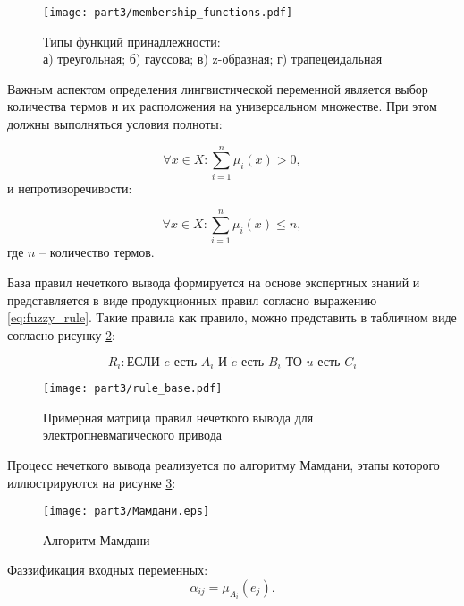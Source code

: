 \begin{figure}[ht]
	\centering
	\texttt{[image: part3/membership\_functions.pdf]}
	\caption{Типы функций принадлежности:\\
		а) треугольная; б) гауссова; в) z-образная; г) трапецеидальная}
	\label{fig:membership_functions_types}
\end{figure}

Важным аспектом определения лингвистической переменной является выбор
количества термов и их расположения
на универсальном множестве. При этом должны выполняться условия полноты:

\begin{equation*}
	\forall x \in X: \sum_{i=1}^n \mu_i(x) > 0,
\end{equation*}
и непротиворечивости:

\begin{equation}
	\forall x \in X: \sum_{i=1}^n \mu_i(x) \leq n,
\end{equation}
где $n$ -- количество термов.

База правил нечеткого вывода формируется на основе экспертных знаний
и представляется в виде продукционных правил согласно выражению \ref{eq:fuzzy_rule}. Такие правила как правило,
можно представить в табличном виде согласно рисунку \ref{fig:fuzzy_rules}:

\begin{equation}\label{eq:fuzzy_rule}
	R_i: \text{ЕСЛИ } e \text{ есть } A_i \text{ И } \dot{e} \text{ есть } B_i \text{ ТО } u \text{ есть } C_i
\end{equation}

\begin{figure}[ht]
	\centering
	\texttt{[image: part3/rule\_base.pdf]}
	\caption{Примерная матрица правил нечеткого вывода для электропневматического привода}
	\label{fig:fuzzy_rules}
\end{figure}

Процесс нечеткого вывода реализуется по алгоритму Мамдани,
этапы которого иллюстрируются на рисунке \ref{fig:fuzzy_inference}:

\begin{figure}[ht]
	\centering
	\texttt{[image: part3/Мамдани.eps]}
	\caption{Алгоритм Мамдани}
	\label{fig:fuzzy_inference}
\end{figure}

Фаззификация входных переменных:
\begin{equation*}
	\alpha_{ij} = \mu_{A_i}(e_j).
\end{equation*}

